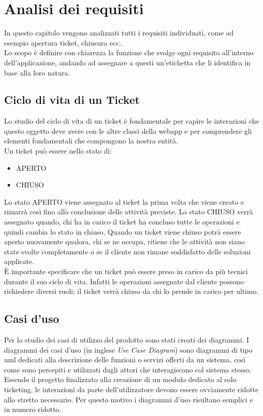 \chapter{Analisi dei requisiti}
\label{cap:analisi-requisiti}

In questo capitolo vengono analizzati tutti i requisiti individuati, come ad esempio apertura ticket, chiusura ecc..\\
Lo scopo è definire con chiarezza la funzione che svolge ogni requisito all'interno dell'applicazione, andando  ad assegnare a questi un'etichetta che li identifica in base alla  loro natura.
\section{Ciclo di vita di un Ticket}
Lo studio del ciclo di vita di un ticket è fondamentale per capire le interazioni che questo oggetto deve avere con le altre classi della webapp e per comprendere gli elementi fondamentali che compongono la nostra entità. \\
Un ticket può essere nello stato di:
\begin{itemize}
\item APERTO
\item CHIUSO
\end{itemize}
Lo stato APERTO viene assegnato al ticket la prima volta che viene creato e rimarrà così fino allo conclusione delle attività previste.
Lo stato CHIUSO verrà assegnato quando, chi ha in carico il ticket ha concluso tutte le operazioni e quindi cambia lo stato in chiuso.
Quando un ticket viene chiuso potrà essere aperto nuovamente qualora, chi se ne occupa, ritiene che le attività non siano state svolte completamente o se il cliente non rimane soddisfatto delle soluzioni applicate.\\
È importante specificare che un ticket può essere preso in carico da più tecnici durante il suo ciclo di vita. Infatti le operazioni assegnate dal cliente possono richiedere diversi ruoli; il ticket verrà chiuso da chi lo prende in carico per ultimo.
\section{Casi d'uso}

Per lo studio dei casi di utilizzo del prodotto sono stati creati dei diagrammi.
I diagrammi dei casi d'uso (in inglese \emph{Use Case Diagram}) sono diagrammi di tipo \gls{uml} dedicati alla descrizione delle funzioni o servizi offerti da un sistema, così come sono percepiti e utilizzati dagli attori che interagiscono col sistema stesso.
Essendo il progetto finalizzato alla creazione di un modulo dedicato al solo ticketing, le interazioni da parte dell'utilizzatore devono essere ovviamente ridotte allo stretto necessario. Per questo motivo i diagrammi d'uso risultano semplici e in numero ridotto.


